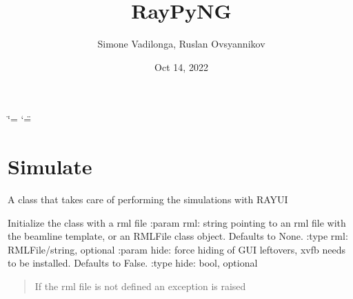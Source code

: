 \documentclass[letterpaper,10pt,english]{sphinxmanual}
\title{RayPyNG}
\date{Oct 14, 2022}
\author{Simone Vadilonga, Ruslan Ovsyannikov}
\begin{document}
\ifdefined\shorthandoff
  \ifnum\catcode`\=\string=\active\shorthandoff{=}\fi
  \ifnum\catcode`\"=\active{}\fi
\fi

\pagestyle{empty}
\sphinxmaketitle
\pagestyle{plain}
\sphinxtableofcontents
\pagestyle{normal}
\label{\detokenize{index::doc}}



\chapter{Simulate}
\label{\detokenize{index:simulate}}

\begin{fulllineitems}
\label{\detokenize{index:raypyng.simulate.Simulate}}
\pysigstartsignatures
{}
\pysigstopsignatures
\sphinxAtStartPar
A class that takes care of performing the simulations with RAY\sphinxhyphen{}UI

\begin{fulllineitems}
\label{\detokenize{index:raypyng.simulate.Simulate.__init__}}
\pysigstartsignatures
{}
\pysigstopsignatures
\sphinxAtStartPar
Initialize the class with a rml file
:param rml: string pointing to an rml file with the beamline template, or an RMLFile class object. Defaults to None.
:type rml: RMLFile/string, optional
:param hide: force hiding of GUI leftovers, xvfb needs to be installed. Defaults to False.
:type hide: bool, optional
\begin{quote}\begin{description}
\sphinxAtStartPar
{} \textendash{} If the rml file is not defined an exception is raised


\end{description}
\end{quote}
\end{fulllineitems}
\end{fulllineitems}
\end{document}
